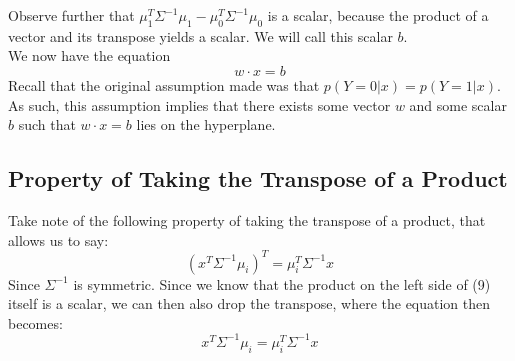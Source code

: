 \documentclass[11pt]{article}
\begin{document}
\noindent Observe further that $\mu^T_1\Sigma^{-1}\mu_1 - \mu^T_0\Sigma^{-1}\mu_0$ is a scalar, because the product of a vector and its transpose yields a scalar. We will call this scalar $b$.\\

\noindent We now have the equation
\begin{equation}
w \cdot x = b
\end{equation}
Recall that the original assumption made was that $p(Y=0|x) = p(Y=1|x)$. As such, this assumption implies that there exists some vector $w$ and some scalar $b$ such that $w \cdot x = b$ lies on the hyperplane.

\subsection*{Property of Taking the Transpose of a Product}
Take note of the following property of taking the transpose of a product, that allows us to say:
\begin{equation}
(x^T\Sigma^{-1}\mu_i)^T = \mu^T_i \Sigma^{-1}x
\end{equation}
Since $\Sigma^{-1}$ is symmetric. Since we know that the product on the left side of (9) itself is a scalar, we can then also drop the transpose, where the equation then becomes:
\begin{equation}
x^T\Sigma^{-1}\mu_i = \mu^T_i \Sigma^{-1}x
\end{equation}
\end{document}

